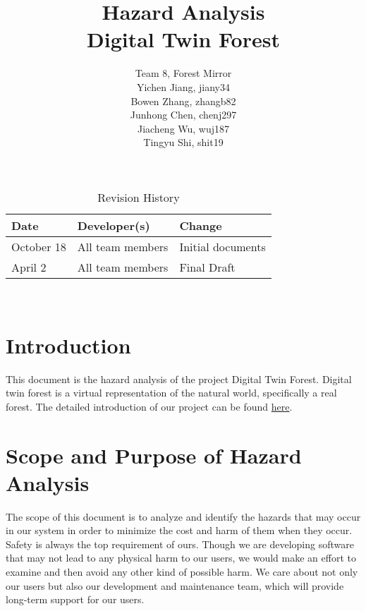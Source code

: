 \documentclass{article}
\title{Hazard Analysis\\Digital Twin Forest}
\author{Team 8, Forest Mirror
		\\ Yichen Jiang, jiany34
		\\ Bowen Zhang, zhangb82
		\\ Junhong Chen, chenj297
		\\ Jiacheng Wu, wuj187
		\\ Tingyu Shi, shit19
}
\date{}
\begin{document}
\maketitle
\thispagestyle{empty}


\begin{table}[hp]
\caption{Revision History} \label{TblRevisionHistory}
\begin{tabularx}{\textwidth}{llX}
\toprule
\textbf{Date} & \textbf{Developer(s)} & \textbf{Change}\\
\midrule
October 18 & All team members & Initial documents\\
\hline
April 2 & All team members & Final Draft \\
\bottomrule
\end{tabularx}
\end{table}




~\newpage

\tableofcontents
\listoftables
\listoffigures
\cleardoublepage


\section{Introduction}

This document is the hazard analysis of the project Digital Twin 
Forest. Digital twin forest is a virtual representation of the 
natural world, specifically a real forest. The detailed introduction
of our project can be found \href{https://github.com/wuj187/DigitalTwinCAS/blob/main/docs/ProblemStatementAndGoals/ProblemStatement.pdf}{here}.

\section{Scope and Purpose of Hazard Analysis}

The scope of this document is to analyze and identify the hazards 
that may occur in our system  in order to minimize the cost and harm
of them when they occur.\\

\noindent Safety is always the top requirement of ours. Though we 
are developing software that may not lead to any physical harm to 
our users, we would make an effort to examine and then avoid any
other kind of possible harm. We care about not only our users but 
also our development and maintenance team, which will
provide long-term support for our users.\\
\end{document}

